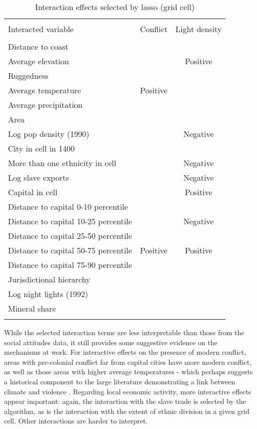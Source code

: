 \begin{table}[!htbp] \centering 
  \caption{Interaction effects selected by lasso (grid cell)} 
  \label{lasso_2} 
\footnotesize 
\begin{tabular}{@{\extracolsep{2pt}} lcc} 
\\[-1.8ex]\hline 
\hline \\[-1.8ex] 
Interacted variable & Conflict & Light density \\ 
\hline \\[-1.8ex] 
Distance to coast &   &   \\ 
Average elevation &   & Positive \\ 
Ruggedness &   &   \\ 
Average temperature & Positive &   \\ 
Average precipitation &   &   \\ 
Area &   &   \\ 
Log pop density (1990) &   & Negative \\ 
City in cell in 1400 &   &   \\ 
More than one ethnicity in cell &   & Negative \\ 
Log slave exports &   & Negative \\ 
Capital in cell &   & Positive \\ 
Distance to capital 0-10 percentile &   &   \\ 
Distance to capital 10-25 percentile &   & Negative \\ 
Distance to capital 25-50 percentile &   &   \\ 
Distance to capital 50-75 percentile & Positive & Positive \\ 
Distance to capital 75-90 percentile &   &   \\ 
Jurisdictional hierarchy &   &   \\ 
Log night lights (1992) &   &   \\ 
Mineral share &   &   \\ 
\hline \\[-1.8ex] 
\end{tabular} 
\end{table}

While the selected interaction terms are less interpretable than those from the social attitudes data, it still provides some suggestive evidence on the mechanisms at work. For interactive effects on the presence of modern conflict, areas with pre-colonial conflict far from capital cities have more modern conflict, as well as those areas with higher average temperatures - which perhaps suggests a historical component to the large literature demonstrating a link between climate and violence \citep{hsiang2013quantifying}. Regarding local economic activity, more interactive effects appear important: again, the interaction with the slave trade is selected by the algorithm, as is the interaction with the extent of ethnic division in a given grid cell. Other interactions are harder to interpret. 

